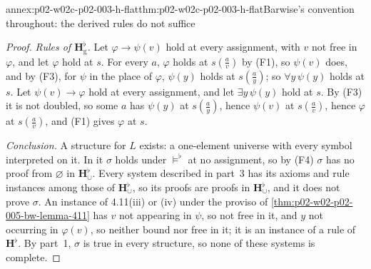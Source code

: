 \begin{annexitem}{annex:p02-w02c-p02-003-h-flat}{thm:p02-w02c-p02-003-h-flat}{Barwise's convention throughout: the derived rules do not suffice}
\begin{proof}
\emph{Rules of \(\mathbf H^{\flat}_{\mathrm g}\).}  Let
\(\varphi\to\psi(v)\) hold at every assignment, with \(v\) not free in
\(\varphi\), and let \(\varphi\) hold at \(s\).  For every \(a\),
\(\varphi\) holds at \(s(\tfrac av)\) by (F1), so \(\psi(v)\) does, and by
(F3), for \(\psi\) in the place of \(\varphi\), \(\psi(y)\) holds at
\(s(\tfrac ay)\); so \(\forall y\,\psi(y)\) holds at \(s\).  Let
\(\psi(v)\to\varphi\) hold at every assignment, and let
\(\exists y\,\psi(y)\) hold at \(s\).  By (F3) it is not doubled, so some
\(a\) has \(\psi(y)\) at \(s(\tfrac ay)\), hence \(\psi(v)\) at
\(s(\tfrac av)\), hence \(\varphi\) at \(s(\tfrac av)\), and (F1) gives
\(\varphi\) at \(s\).

\emph{Conclusion.}  A structure for \(L\) exists: a one-element universe
with every symbol interpreted on it.  In it \(\sigma\) holds under
\(\models^{\flat}\) at no assignment, so by (F4) \(\sigma\) has no proof from
\(\varnothing\) in \(\mathbf H^{\flat}_{\cup}\).  Every system described in
part~3 has its axioms and rule instances among those of
\(\mathbf H^{\flat}_{\cup}\), so its proofs are proofs in
\(\mathbf H^{\flat}_{\cup}\), and it does not prove \(\sigma\).  An instance
of 4.11(iii) or (iv) under the proviso of
\cref{thm:p02-w02-p02-005-bw-lemma-411} has \(v\) not appearing in \(\psi\),
so not free in it, and \(y\) not occurring in \(\varphi(v)\), so neither
bound nor free in it; it is an instance of a rule of \(\mathbf H^{\flat}\).
By part~1, \(\sigma\) is true in every structure, so none of these systems
is complete.
\end{proof}
\end{annexitem}

